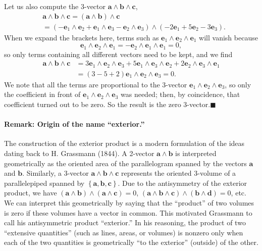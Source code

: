 Let us also compute the 3-vector $\mathbf{a}\wedge\mathbf{b}\wedge\mathbf{c}$,\begin{align*}
 & \mathbf{a}\wedge\mathbf{b}\wedge\mathbf{c}=\left(\mathbf{a}\wedge\mathbf{b}\right)\wedge\mathbf{c}\\
 & =\left(-\mathbf{e}_{1}\wedge\mathbf{e}_{2}+\mathbf{e}_{1}\wedge\mathbf{e}_{3}-\mathbf{e}_{2}\wedge\mathbf{e}_{3}\right)\wedge(-2\mathbf{e}_{1}+5\mathbf{e}_{2}-3\mathbf{e}_{3}).\end{align*}
When we expand the brackets here, terms such as $\mathbf{e}_{1}\wedge\mathbf{e}_{2}\wedge\mathbf{e}_{1}$
will vanish because \[
\mathbf{e}_{1}\wedge\mathbf{e}_{2}\wedge\mathbf{e}_{1}=-\mathbf{e}_{2}\wedge\mathbf{e}_{1}\wedge\mathbf{e}_{1}=0,\]
so only terms containing all different vectors need to be kept, and
we find\begin{align*}
\mathbf{a}\wedge\mathbf{b}\wedge\mathbf{c} & =3\mathbf{e}_{1}\wedge\mathbf{e}_{2}\wedge\mathbf{e}_{3}+5\mathbf{e}_{1}\wedge\mathbf{e}_{3}\wedge\mathbf{e}_{2}+2\mathbf{e}_{2}\wedge\mathbf{e}_{3}\wedge\mathbf{e}_{1}\\
 & =\left(3-5+2\right)\mathbf{e}_{1}\wedge\mathbf{e}_{2}\wedge\mathbf{e}_{3}=0.\end{align*}
We note that all the terms are proportional to the 3-vector $\mathbf{e}_{1}\wedge\mathbf{e}_{2}\wedge\mathbf{e}_{3}$,
so only the coefficient in front of $\mathbf{e}_{1}\wedge\mathbf{e}_{2}\wedge\mathbf{e}_{3}$
was needed; then, by coincidence, that coefficient turned out to be
zero. So the result is the zero 3-vector.\hfill{}$\blacksquare$



\paragraph{Remark: Origin of the name {}``exterior.''}

The construction of the exterior product
is a modern formulation of the ideas dating back to H. Grassmann (1844).
A 2-vector $\mathbf{a}\wedge\mathbf{b}$ is interpreted geometrically
as the oriented area of the parallelogram spanned by the vectors $\mathbf{a}$
and $\mathbf{b}$. Similarly, a 3-vector $\mathbf{a}\wedge\mathbf{b}\wedge\mathbf{c}$
represents the oriented 3-volume of a parallelepiped spanned by $\left\{ \mathbf{a},\mathbf{b},\mathbf{c}\right\} $.
Due to the antisymmetry of the exterior product, we have $(\mathbf{a}\wedge\mathbf{b})\wedge(\mathbf{a}\wedge\mathbf{c})=0$,
$(\mathbf{a}\wedge\mathbf{b}\wedge\mathbf{c})\wedge(\mathbf{b}\wedge\mathbf{d})=0$,
etc. We can interpret this geometrically by saying that the {}``product''
of two volumes is zero if these volumes have a vector in common. This
motivated Grassmann to call his antisymmetric product {}``exterior.''
In his reasoning, the product of two {}``extensive quantities''
(such as lines, areas, or volumes) is nonzero only when each of the
two quantities is geometrically {}``to the exterior'' (outside)
of the other.


